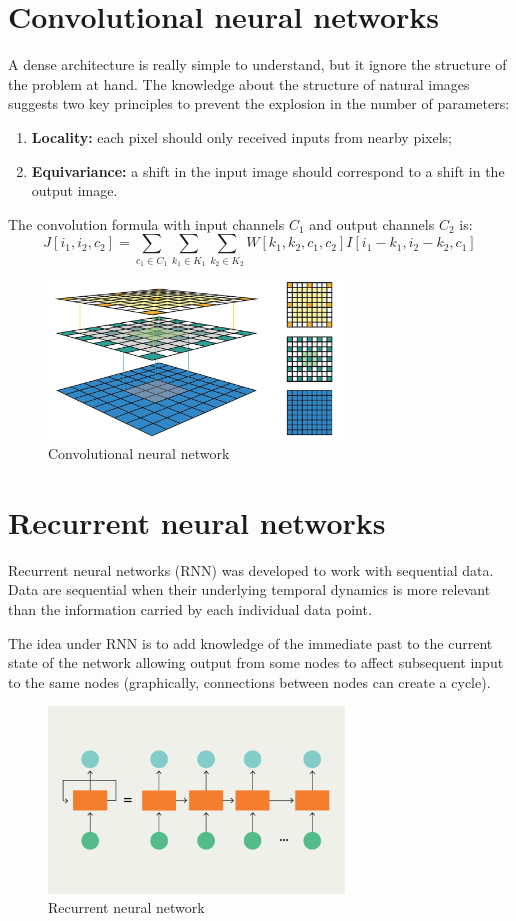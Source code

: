\section{Convolutional neural networks}
A dense architecture is really simple to understand, but it ignore the structure of the problem at hand. The knowledge about the structure of natural images suggests two key principles to prevent the explosion in the number of parameters:
\begin{enumerate}
    \item \textbf{Locality:} each pixel should only received inputs from nearby pixels;
    \item \textbf{Equivariance:} a shift in the input image should correspond to a shift in the output image.
\end{enumerate}


The convolution formula with input channels $C_1$ and output channels $C_2$ is:
\begin{equation}
    J[i_1,i_2,c_2] = \sum_{c_1 \in C_1}\sum_{k_1 \in K_1}\sum_{k_2 \in K_2}{W[k_1, k_2, c_1, c_2]I[i_1 - k_1, i_2 - k_2, c_1]}
\end{equation}


\begin{figure}[H]
    \centering
    \includegraphics[width=0.7\textwidth]{Images/CNN_filter.png}
    \caption{Convolutional neural network}
    \label{fig:CNN_filter}
\end{figure}


\section{Recurrent neural networks}
Recurrent neural networks (RNN) was developed to work with sequential data. Data are sequential when their underlying temporal dynamics is more relevant than the information carried by each individual data point. 

The idea under RNN is to add knowledge of the immediate past to the current state of the network allowing output from some nodes to affect subsequent input to the same nodes (graphically, connections between nodes can create a cycle).

\begin{figure}[H]
    \centering
    \includegraphics[width=0.7\textwidth]{Images/RNN.png}
    \caption{Recurrent neural network}
    \label{fig:RNN}
\end{figure}

